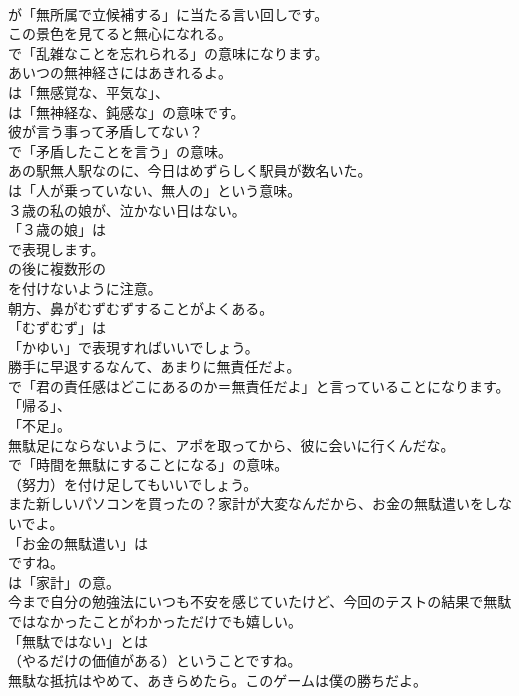 \documentclass[8pt]{extreport}
\begin{document}
\begin{CJK}{UTF8}{min}
\\	が「無所属で立候補する」に当たる言い回しです。	
\\	この景色を見てると無心になれる。 
\\	で「乱雑なことを忘れられる」の意味になります。	
\\	あいつの無神経さにはあきれるよ。 
\\	は「無感覚な、平気な」、
\\	は「無神経な、鈍感な」の意味です。	
\\	彼が言う事って矛盾してない？ 
\\	で「矛盾したことを言う」の意味。	
\\	あの駅無人駅なのに、今日はめずらしく駅員が数名いた。 
\\	は「人が乗っていない、無人の」という意味。	
\\	３歳の私の娘が、泣かない日はない。 
\\	「３歳の娘」は 
\\	で表現します。
\\	の後に複数形の 
\\	を付けないように注意。	
\\	朝方、鼻がむずむずすることがよくある。 
\\	「むずむず」は
\\	「かゆい」で表現すればいいでしょう。	
\\	勝手に早退するなんて、あまりに無責任だよ。 
\\	で「君の責任感はどこにあるのか＝無責任だよ」と言っていることになります。
\\	「帰る」、
\\	「不足」。	
\\	無駄足にならないように、アポを取ってから、彼に会いに行くんだな。 
\\	で「時間を無駄にすることになる」の意味。
\\	（努力）を付け足してもいいでしょう。	
\\	また新しいパソコンを買ったの？家計が大変なんだから、お金の無駄遣いをしないでよ。 
\\	「お金の無駄遣い」は 
\\	ですね。
\\	は「家計」の意。	
\\	今まで自分の勉強法にいつも不安を感じていたけど、今回のテストの結果で無駄ではなかったことがわかっただけでも嬉しい。 
\\	「無駄ではない」とは 
\\	（やるだけの価値がある）ということですね。	
\\	無駄な抵抗はやめて、あきらめたら。このゲームは僕の勝ちだよ。 

\end{CJK}
\end{document}
